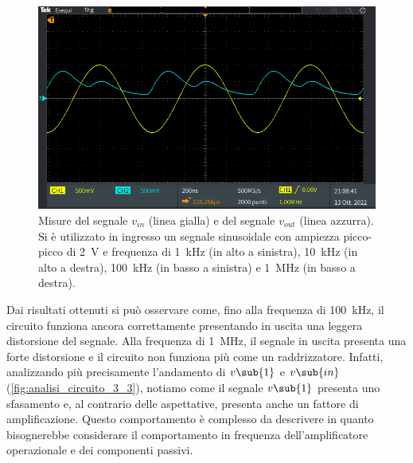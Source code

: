 \begin{figure}[!h]
\begin{minipage}{.496\textwidth}
	\end{minipage}
	\begin{minipage}{.496\textwidth}
		\includegraphics[width=\linewidth]{./ImageFiles/Laboratorio 2/TEK00048.PNG}
	\end{minipage}
	\caption{Misure del segnale $v_{in}$ (linea gialla) e del segnale $v_{out}$ (linea azzurra). Si è utilizzato in ingresso un segnale sinusoidale con ampiezza picco-picco di \SI{2}{\volt} e frequenza di \SI{1}{\kilo\hertz} (in alto a sinistra), \SI{10}{\kilo\hertz} (in alto a destra), \SI{100}{\kilo\hertz} (in basso a sinistra) e \SI{1}{\mega\hertz} (in basso a destra).}
	\label{fig:analisi_circuito_3_freq}
\end{figure}
Dai risultati ottenuti si può osservare come, fino alla frequenza di \SI{100}{\kilo\hertz}, il circuito funziona ancora correttamente presentando in uscita una leggera distorsione del segnale. Alla frequenza di \SI{1}{\mega\hertz}, il segnale in uscita presenta una forte distorsione e il circuito non funziona più come un raddrizzatore. Infatti, analizzando più precisamente l'andamento di $v\sub{1}$ e $v\sub{in}$ (\Fig\ref{fig:analisi_circuito_3_3}), notiamo come il segnale $v\sub{1}$ presenta uno sfasamento e, al contrario delle aspettative, presenta anche un fattore di amplificazione. Questo comportamento è complesso da descrivere in quanto bisognerebbe considerare il comportamento in frequenza dell'amplificatore operazionale e dei componenti passivi.
